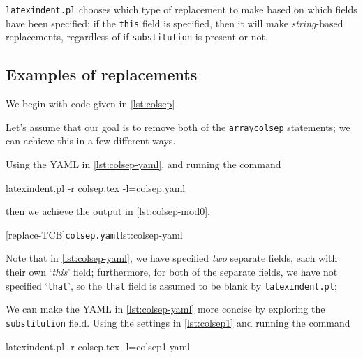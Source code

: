  \texttt{latexindent.pl} chooses which type of replacement to make based on which fields
 have been specified; if the \texttt{this} field is specified, then it will make
 \emph{string}-based replacements, regardless of if \texttt{substitution} is present or
 not.

\subsection{Examples of replacements}
 \begin{example}
 We begin with code given in \cref{lst:colsep}


 Let's assume that our goal is to remove both of the \texttt{arraycolsep} statements; we
 can achieve this in a few different ways.

 Using the YAML in \cref{lst:colsep-yaml}, and running the command  

 \begin{commandshell}
latexindent.pl -r colsep.tex -l=colsep.yaml
\end{commandshell}

 then we achieve the output in \cref{lst:colsep-mod0}.

 \begin{cmhtcbraster}
  [replace-TCB]{\texttt{colsep.yaml}}{lst:colsep-yaml}
 \end{cmhtcbraster}
 Note that in \cref{lst:colsep-yaml}, we have specified \emph{two} separate fields, each
 with their own `\emph{this}' field; furthermore, for both of the separate fields, we have
 not specified `\texttt{that}', so the \texttt{that} field is assumed to be blank by
 \texttt{latexindent.pl};

 We can make the YAML in \cref{lst:colsep-yaml} more concise by exploring the
 \texttt{substitution} field. Using the settings in \cref{lst:colsep1} and running the
 command  

 \begin{commandshell}
latexindent.pl -r colsep.tex -l=colsep1.yaml
\end{commandshell}


\end{example}
